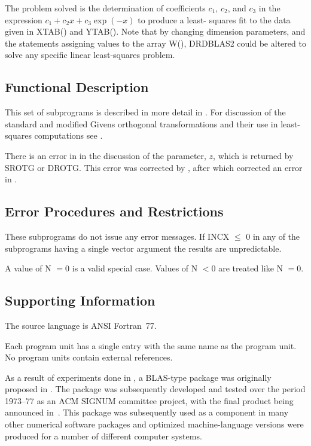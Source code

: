 \documentclass[twoside]{MATH77}
\begin{document}
The problem solved is the determination of coefficients $c_1$, $c_2$, and $%
c_3$ in the expression $c_1 + c_2x + c_3\exp (-x)$ to produce a least-%
squares fit to the data given in XTAB() and YTAB(). Note that by changing
dimension parameters, and the statements assigning values to the array W(),
DRDBLAS2 could be altered to solve any specific linear least-squares problem.

\subsection{Functional Description}

This set of subprograms is described in more detail in \cite{Lawson:1979:BLA}.
For discussion of the standard and modified Givens orthogonal transformations
and their use in least-squares computations see \cite{Lawson:1974:SLS}.

There is an error in \cite{Lawson:1979:BLA} in the discussion of the
parameter, $z$, which is returned by SROTG or DROTG.  This error was
corrected by \cite{Dodson:1982:RBL}, after which \cite{Dodson:1983:CRB}
corrected an error in \cite{Dodson:1982:RBL}.




\subsection{Error Procedures and Restrictions}

These subprograms do not issue any error messages. If INCX $\leq $ 0 in any
of the subprograms having a single vector argument the results are
unpredictable.

A value of N $= 0$ is a valid special case. Values of N $< 0$ are treated
like N $= 0.$

\subsection{Supporting Information}

The source language is ANSI Fortran~77.

Each program unit has a single entry with the same name as the program unit.
No program units contain external references.

As a result of experiments done in \cite{Krogh:1972:OUA}, a BLAS-type
package was originally proposed in \cite{Hanson:1973:APS}.  The package
was subsequently developed and tested over the period 1973--77 as an ACM
SIGNUM committee project, with the final product being announced
in~\cite{Lawson:1979:BLA}.  This package was subsequently used as a
component in many other numerical software packages and optimized
machine-language versions were produced for a number of different computer
systems.
\end{document}
